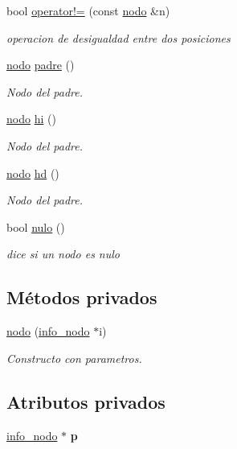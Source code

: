 \begin{DoxyCompactItemize}
bool \hyperlink{classArbolBinario_1_1nodo_a274a6b1912079430c2be6fa3a9f2010d}{operator!=} (const \hyperlink{classArbolBinario_1_1nodo}{nodo} \&n)
\begin{DoxyCompactList}\small\item\em operacion de desigualdad entre dos posiciones \end{DoxyCompactList}\item 
\hyperlink{classArbolBinario_1_1nodo}{nodo} \hyperlink{classArbolBinario_1_1nodo_a78b4d51bc9bd22f16a70c8e2bee3fef1}{padre} ()
\begin{DoxyCompactList}\small\item\em Nodo del padre. \end{DoxyCompactList}\item 
\hyperlink{classArbolBinario_1_1nodo}{nodo} \hyperlink{classArbolBinario_1_1nodo_a6dd19bf49c4336014f85f83f6a9f5943}{hi} ()
\begin{DoxyCompactList}\small\item\em Nodo del padre. \end{DoxyCompactList}\item 
\hyperlink{classArbolBinario_1_1nodo}{nodo} \hyperlink{classArbolBinario_1_1nodo_ab4bd1d7b0ae90543b89a3b7e4d7d4470}{hd} ()
\begin{DoxyCompactList}\small\item\em Nodo del padre. \end{DoxyCompactList}\item 
bool \hyperlink{classArbolBinario_1_1nodo_a92f885c1e463d5c24a66281c6589b4a3}{nulo} ()
\begin{DoxyCompactList}\small\item\em dice si un nodo es nulo \end{DoxyCompactList}\end{DoxyCompactItemize}
\subsection*{Métodos privados}
\begin{DoxyCompactItemize}
\item 
\hyperlink{classArbolBinario_1_1nodo_a9c0015bf78e40fc811ad106804cba939}{nodo} (\hyperlink{structArbolBinario_1_1info__nodo}{info\+\_\+nodo} $\ast$i)
\begin{DoxyCompactList}\small\item\em Constructo con parametros. \end{DoxyCompactList}\end{DoxyCompactItemize}
\subsection*{Atributos privados}
\begin{DoxyCompactItemize}
\item 
\mbox{\label{classArbolBinario_1_1nodo_a7be0572f10c8181362aec9878ff210f0}} 
\hyperlink{structArbolBinario_1_1info__nodo}{info\+\_\+nodo} $\ast$ {\bfseries p}
\end{DoxyCompactItemize}
